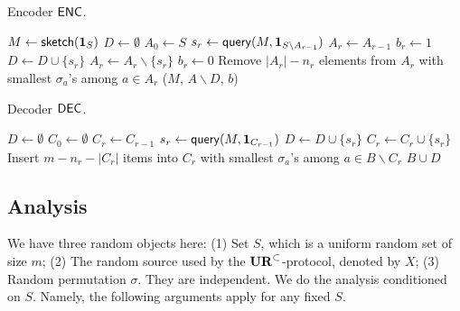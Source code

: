 \begin{algorithm}[H] 
  \caption{Encoder $\textsf{ENC}$.} \label{algo:enc}
  \begin{algorithmic}[1]
    \State $M \leftarrow \mathsf{sketch}(\mathbf{1}_S)$
    \State $D\leftarrow \emptyset$
    \State $A_0 \leftarrow S$
      \State $s_r\leftarrow \mathsf{query}(M, \mathbf{1}_{S\backslash A_{r-1}})$
      \State $A_r\leftarrow A_{r-1}$
       
        \State $b_r\leftarrow 1$ 
        \State $D\leftarrow D \cup \{s_r\}$
        \State $A_r\leftarrow A_r \backslash \{s_r\}$
      \Else 
        \State $b_r\leftarrow 0$
      \EndIf
      \State Remove $|A_r|-n_r$ elements from $A_r$ with smallest $\sigma_a$'s among $a\in A_r$ 
    \EndFor
    \State \Return ($M$, $A\backslash D$, $b$) 
    \EndProcedure
  \end{algorithmic}
\end{algorithm}

\begin{algorithm}[H] 
  \caption{Decoder $\textsf{DEC}$.} \label{algo:dec}
  \begin{algorithmic}[1]
    \State $D\leftarrow \emptyset$
    \State $C_0 \leftarrow \emptyset$
      \State $C_r\leftarrow C_{r-1}$
        \State $s_r\leftarrow \mathsf{query}(M, \mathbf{1}_{C_{r-1}})$ 
        \State $D\leftarrow D \cup \{s_r\}$
        \State $C_r\leftarrow C_r \cup \{s_r\}$
      \EndIf
       \State Insert $m-n_r-|C_r|$ items into $C_r$ with smallest $\sigma_a$'s among $a\in B\backslash C_r$
    \EndFor
    \State \Return $B\cup D$ 
    \EndProcedure
  \end{algorithmic}
\end{algorithm}

\subsection{Analysis}

We have three random objects here: 
(1) Set $S$, which is a uniform random set of size $m$; 
(2) The random source used by the $\mathbf{UR}^\subset$-protocol, denoted by $X$; 
(3) Random permutation $\sigma$. 
They are independent. 
We do the analysis conditioned on $S$. 
Namely, the following arguments apply for any fixed $S$. 

